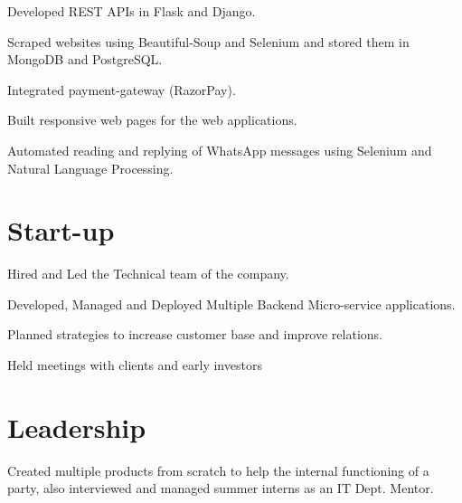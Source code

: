 \documentclass[]{deedy-resume-openfont}
\begin{document}
\begin{minipage}[t]{0.66\textwidth}
\begin{tightemize}
\item Developed REST APIs in Flask and Django.
\item Scraped websites using Beautiful-Soup and Selenium and stored them in MongoDB and PostgreSQL.
\item Integrated payment-gateway (RazorPay).
\item Built responsive web pages for the web applications.
\item Automated reading and replying of WhatsApp messages using Selenium and Natural Language Processing. 
\end{tightemize}
\sectionsep


\section{Start-up}
\begin{tightemize}
\item Hired and Led the Technical team of the company.
\item Developed, Managed and Deployed Multiple Backend Micro-service applications.
\item Planned strategies to increase customer base and improve relations.
\item Held meetings with clients and early investors
\end{tightemize}
\sectionsep


\section{Leadership}
Created multiple products from scratch to help the internal functioning of a party, also interviewed and managed summer interns as an IT Dept. Mentor.
\sectionsep

\end{minipage} 
\end{document}
